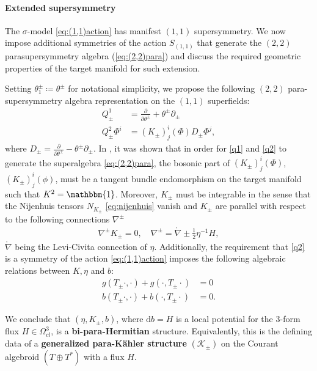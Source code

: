 \documentclass[letterpaper,12pt]{article}
\newcommand{\TT}{{T\oplus T^*}}
\newcommand{\KK}{\mathcal{K}}
\newcommand{\id}{\mathbbm{1}}
\newcommand{\lc}{\mathring{\n}}
\newcommand{\p}{\partial}
\newcommand{\n}{\nabla}
\newcommand{\rd}{\mathrm{d}}
\theoremstyle{definition}
\theoremstyle{remark}
\theoremstyle{examples}
\begin{document}
\paragraph{Extended supersymmetry}

The $\sigma$-model \eqref{eq:(1,1)action} has manifest $(1,1)$ supersymmetry.  We now impose additional symmetries of the action $S_{(1,1)}$ that generate the $(2,2)$ parasupersymmetry algebra (\ref{eq:(2,2)para}) and discuss the required geometric properties of the target manifold for such extension.

Setting $\theta^\pm_1\coloneqq \theta^\pm$ for notational simplicity, we propose the following $(2,2)$ para-supersymmetry algebra representation on the $(1,1)$ superfields:
\begin{align}
\label{q1} Q^1_\pm&=\frac{\p}{\p\theta^\pm}+\theta^\pm\p_\pm \\
\label{q2} Q^2_\pm\Phi^i&=(K_\pm)^i_j(\Phi)D_\pm\Phi^j,
\end{align}
where $D_\pm =\frac{\p}{\p\theta^\pm}-\theta^\pm\p_\pm$. In \cite{HullTwistedSUSY}, it was shown that in order for \eqref{q1} and \eqref{q2} to generate the superalgebra \eqref{eq:(2,2)para}, the bosonic part of $(K_\pm)^i_j(\Phi)$, $(K_\pm)^i_j(\phi)$, must be a tangent bundle endomorphism on the target manifold such that $K^2=\id$. Moreover, $K_\pm$ must be integrable in the sense that the Nijenhuis tensors $N_{K_\pm}$ \eqref{eq:nijenhuis} vanish and $K_\pm$ are parallel with respect to the following connections $\n^\pm$
\begin{align*}
\n^\pm K_\pm=0, \quad \n^\pm=\lc\pm\frac{1}{2}\eta^{-1}H,
\end{align*}
$\lc$ being the Levi-Civita connection of $\eta$. Additionally, the requirement that \eqref{q2} is a symmetry of the action \eqref{eq:(1,1)action} imposes the following algebraic relations between $K,\eta$ and $b$:
\begin{align*}
g(T_\pm\cdot,\cdot)+g(\cdot,T_\pm\cdot)&=0\\
b(T_\pm\cdot,\cdot)+b(\cdot,T_\pm\cdot)&=0.
\end{align*}

We conclude that $(\eta,K_\pm,b)$, where $\rd b=H$ is a local potential for the $3$-form flux $H\in\Omega_{cl}^3$, is a {\bf bi-para-Hermitian} structure. Equivalently, this is the defining data of a {\bf generalized para-K\"ahler structure} $(\KK_\pm)$ on the Courant algebroid $(\TT)$ with a flux $H$.
\end{document}
